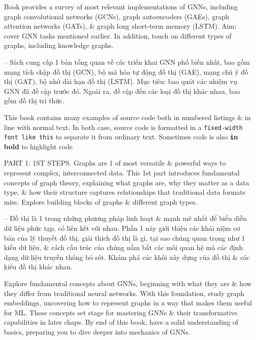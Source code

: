 \documentclass{article}
\begin{document}
\begin{itemize}
\begin{itemize}
        Book provides a survey of most relevant implementations of GNNs, including graph convolutional networks (GCNs), graph autoencoders (GAEs), graph attention networks (GATs), \& graph long short-term memory (LSTM). Aim: cover GNN tasks mentioned earlier. In addition, touch on different types of graphs, including knowledge graphs.

        -- Sách cung cấp 1 bản tổng quan về các triển khai GNN phổ biến nhất, bao gồm mạng tích chập đồ thị (GCN), bộ mã hóa tự động đồ thị (GAE), mạng chú ý đồ thị (GAT), bộ nhớ dài hạn đồ thị (LSTM). Mục tiêu: bao quát các nhiệm vụ GNN đã đề cập trước đó. Ngoài ra, đề cập đến các loại đồ thị khác nhau, bao gồm đồ thị tri thức.

        This book contains many examples of source code both in numbered listings \& in line with normal text. In both case, source code is formatted in a {\tt fixed-width font like this} to separate it from ordinary text. Sometimes code is also \textbf{\texttt in bold} to highlight code
    \end{itemize}
    PART 1: 1ST STEPS. Graphs are 1 of most versatile \& powerful ways to represent complex, interconnected data. This 1st part introduces fundamental concepts of graph theory, explaining what graphs are, why they matter as a data type, \& how their structure captures relationships that traditional data formats miss. Explore building blocks of graphs \& different graph types.

    -- Đồ thị là 1 trong những phương pháp linh hoạt \& mạnh mẽ nhất để biểu diễn dữ liệu phức tạp, có liên kết với nhau. Phần 1 này giới thiệu các khái niệm cơ bản của lý thuyết đồ thị, giải thích đồ thị là gì, tại sao chúng quan trọng như 1 kiểu dữ liệu, \& cách cấu trúc của chúng nắm bắt các mối quan hệ mà các định dạng dữ liệu truyền thống bỏ sót. Khám phá các khối xây dựng của đồ thị \& các kiểu đồ thị khác nhau.

    Explore fundamental concepts about GNNs, beginning with what they are \& how they differ from traditional neural networks. With this foundation, study graph embeddings, uncovering how to represent graphs in a way that makes them useful for ML. These concepts set stage for mastering GNNs \& their transformative capabilities in later chaps. By end of this book, have a solid understanding of basics, preparing you to dive deeper into mechanics of GNNs.


\end{itemize}
\end{document}
